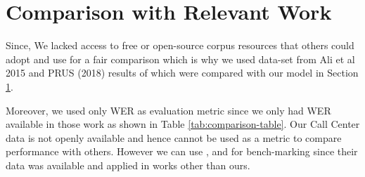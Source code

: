 \documentclass{article}
\begin{document}

\section{Comparison with Relevant Work} %
\label{sec:comparison_result}

Since, We lacked access to free or open-source corpus resources that others could adopt and use for a fair comparison which is why we used data-set from Ali et al 2015 \cite{ali_automatic_2015} and PRUS (2018) \cite{zia_pronouncur_2018, qureshi_urdu_2021} results of which were compared with our model in Section \ref{sec:comparison_result}.

Moreover, we used only WER as evaluation metric since we only had WER available in those work as shown in Table \ref{tab:comparison-table}. Our Call Center data is not openly available and hence cannot be used as a metric to compare performance with others. However we can use \cite{ali_automatic_2015}, \cite{sehar_gul_detecting_2020} and \cite{qureshi_urdu_2021} for bench-marking since their data was available and applied in works other than ours. 

\end{document}
